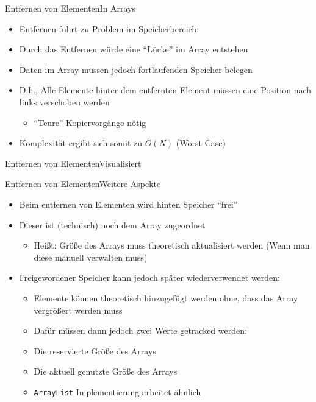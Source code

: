 \begin{frame}{Entfernen von Elementen}{In Arrays}
	\begin{itemize}
		\item Entfernen führt zu Problem im Speicherbereich:
		\item Durch das Entfernen würde eine "`Lücke"' im Array entstehen
		\item Daten im Array müssen jedoch fortlaufenden Speicher belegen
		\item D.h., Alle Elemente hinter dem entfernten Element müssen eine Position nach links verschoben werden
		\begin{itemize}
			\item "`Teure"' Kopiervorgänge nötig
		\end{itemize}
		\item Komplexität ergibt sich somit zu $O(N)$ (Worst-Case)
	\end{itemize}
\end{frame}

\begin{frame}{Entfernen von Elementen}{Visualisiert}
\end{frame}

\begin{frame}{Entfernen von Elementen}{Weitere Aspekte}
	\begin{itemize}
		\item Beim entfernen von Elementen wird hinten Speicher "`frei"'
		\item Dieser ist (technisch) noch dem Array zugeordnet
		\begin{itemize}
			\item Heißt: Größe des Arrays muss theoretisch aktualisiert werden (Wenn man diese manuell verwalten muss)
		\end{itemize}
		\item Freigewordener Speicher kann jedoch später wiederverwendet werden:
		\begin{itemize}
			\item Elemente können theoretisch hinzugefügt werden ohne, dass das Array vergrößert werden muss
			\item Dafür müssen dann jedoch zwei Werte getracked werden:
			\item Die reservierte Größe des Arrays
			\item Die aktuell genutzte Größe des Arrays
			\item \texttt{ArrayList} Implementierung arbeitet ähnlich
		\end{itemize}
	\end{itemize}
\end{frame}

